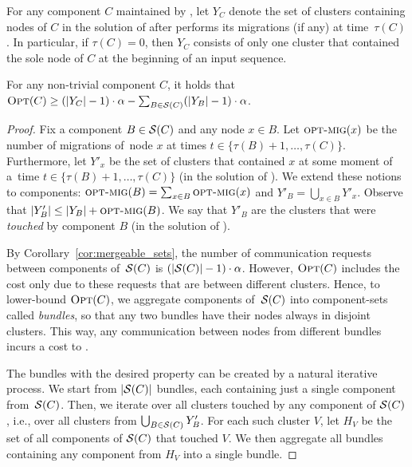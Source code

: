 For any component $C$ maintained by \CREP, let $Y_C$ denote the set of clusters
containing nodes of $C$ in the solution of \OPT after \OPT performs its
migrations (if any) at time~$\tau(C)$. In particular, if $\tau(C) = 0$, then
$Y_C$ consists of only one cluster that contained the sole node of $C$ 
at the beginning of an input sequence.

\begin{lemma}
\label{lem:opt_recursive_bound}
For any non-trivial component $C$, it holds that $\textsc{Opt}(C) \geq (|Y_C| - 1)
\cdot \alpha - \sum_{B \in \mathcal{S}(C)} (|Y_B| - 1) \cdot \alpha$.
\end{lemma}

\begin{proof}
Fix a component $B \in \mathcal{S}(C)$ and any node $x \in B$. Let $\textsc{opt-mig}(x)$ be the
number of \OPT migrations of~node $x$ at times $t \in \{ \tau(B)+1, \ldots,
\tau(C) \}$. Furthermore, let $Y'_x$ be the set of clusters that
contained $x$ at some moment of a~time $t \in \{ \tau(B)+1, \ldots, \tau(C)
\}$ (in the solution of \OPT). We extend these notions to components:
$\textsc{opt-mig}(B) = \sum_{x \in B} \textsc{opt-mig}(x)$ and $Y'_B = \bigcup_{x \in B} Y'_x$.
Observe that $|Y'_B| \leq |Y_B| + \textsc{opt-mig}(B)$.
We say that $Y'_B$ are the clusters that were \emph{touched} by component $B$ 
(in the solution of \OPT).

By Corollary~\ref{cor:mergeable_sets}, the number of communication requests between
components of~$\mathcal{S}(C)$ is $(|\mathcal{S}(C)|-1) \cdot \alpha$. However, $\textsc{Opt}(C)$
includes the cost only due to these requests that are between different clusters.
Hence, to lower-bound $\textsc{Opt}(C)$, we aggregate components of~$\mathcal{S}(C)$ into
component-sets called \emph{bundles}, so that any two bundles have their nodes
always in disjoint clusters. This way, any communication between nodes from
different bundles incurs a cost to \OPT.

The bundles with the desired property can be created by a natural iterative 
process. We start from $|\mathcal{S}(C)|$ bundles, each containing just a single 
component from~$\mathcal{S}(C)$. Then, we iterate over all clusters touched 
by any component of $\mathcal{S}(C)$, i.e., over all clusters from $\bigcup_{B \in \mathcal{S}(C)} Y'_B$.
For each such cluster $V$, let $H_V$ be the set 
of all components of $\mathcal{S}(C)$ that touched $V$. We then aggregate all bundles 
containing any component from $H_V$ into a single bundle.


\end{proof}
